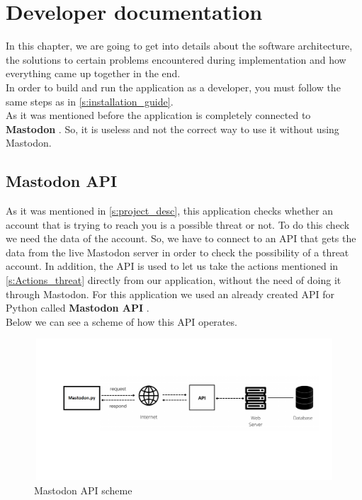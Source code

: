\chapter{Developer documentation}
\label{ch:impl}

In this chapter, we are going to get into details about the software architecture,
the solutions to certain problems encountered during implementation and how everything came up together in the end.
\\[5pt]
In order to build and run the application as a developer, you must follow the same steps as in \ref{s:installation_guide}.
\\[5pt]
As it was mentioned before the application is completely connected to \textbf{Mastodon} \cite{test}. So, it is useless and
not the correct way to use it without using Mastodon.




\section{Mastodon API}\label{s:api}
As it was mentioned in \ref{s:project_desc}, this application checks whether an account
that is trying to reach you is a possible threat or not. To do this check we need the data
of the account. So, we have to connect to an API that gets the data from
the live Mastodon server in order to check the possibility of a threat account.
In addition, the API is used to let us take the actions mentioned in \ref{s:Actions_threat}
directly from our application, without the need of doing it through Mastodon.
For this application we used an already created API for Python called
\textbf{Mastodon API}  \cite{apimast}.
\\[5pt]
Below we can see a scheme of how this API operates.
\\[5pt]
\begin{figure}[H]
	\centering
	\includegraphics[width=1.0\textwidth,height=200px]{images/MastodonApi.png}
	\caption{Mastodon API scheme}
	\label{fig:mast_api}
\end{figure}
